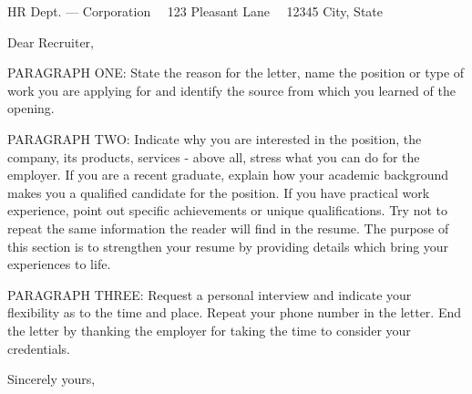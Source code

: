 \documentclass{resume}[2010/07/10 v0.9 Resume class]
\renewcommand{\\}{\ {\large\textperiodcentered}\ }
\begin{document}

\begin{letter}{ %
HR Dept. --- Corporation\\
123 Pleasant Lane\\
12345 City, State
}


\opening{Dear Recruiter,}

PARAGRAPH ONE: State the reason for the letter, name the position or type of work you are applying for and identify the source from which you learned of the opening.\\

PARAGRAPH TWO: Indicate why you are interested in the position, the company, its products, services - above all, stress what you can do for the employer. If you are a recent graduate, explain how your academic background makes you a qualified candidate for the position. If you have practical work experience, point out specific achievements or unique qualifications. Try not to repeat the same information the reader will find in the resume. The purpose of this section is to strengthen your resume by providing details which bring your experiences to life.\\

PARAGRAPH THREE: Request a personal interview and indicate your flexibility as to the time and place. Repeat your phone number in the letter. End the letter by thanking the employer for taking the time to consider your credentials.\\

Sincerely yours, \\ \\ \\


\end{letter}
\end{document}
